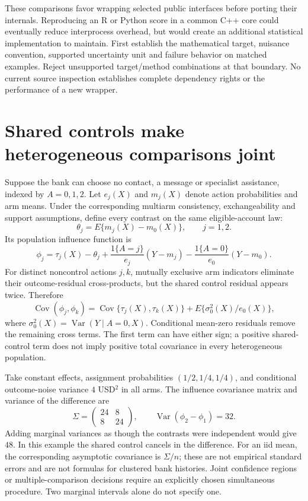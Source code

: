 These comparisons favor wrapping selected public interfaces before porting
their internals. Reproducing an R or Python score in a common C++ core could
eventually reduce interprocess overhead, but would create an additional
statistical implementation to maintain. First establish the mathematical
target, nuisance convention, supported uncertainty unit and failure behavior
on matched examples. Reject unsupported target/method combinations at that
boundary. No current source inspection establishes complete dependency rights
or the performance of a new wrapper.~\citep{exec17_s4_design}

\section{Shared controls make heterogeneous comparisons joint}
\label{exec17:s4-joint}

Suppose the bank can choose no contact, a message or specialist assistance,
indexed by $A=0,1,2$. Let $e_j(X)$ and $m_j(X)$ denote action probabilities
and arm means. Under the corresponding multiarm consistency, exchangeability
and support assumptions, define every contrast on the same eligible-account
law:
\[
 \theta_j=E\{m_j(X)-m_0(X)\},\qquad j=1,2.
\]
Its population influence function is
\[
 \phi_j=\tau_j(X)-\theta_j+
       \frac{1\{A=j\}}{e_j}(Y-m_j)
       -\frac{1\{A=0\}}{e_0}(Y-m_0).
\]
For distinct noncontrol actions $j,k$, mutually exclusive arm indicators
eliminate their outcome-residual cross-products, but the shared control
residual appears twice. Therefore
\begin{equation}
 \operatorname{Cov}(\phi_j,\phi_k)=
 \operatorname{Cov}\{\tau_j(X),\tau_k(X)\}
       +E\{\sigma_0^2(X)/e_0(X)\},
 \label{exec17:s4-shared-control}
\end{equation}
where $\sigma_0^2(X)=\operatorname{Var}(Y\mid A=0,X)$.
Conditional mean-zero residuals remove the remaining cross terms. The first
term can have either sign; a positive shared-control term does not imply
positive total covariance in every heterogeneous population.

Take constant effects, assignment probabilities $(1/2,1/4,1/4)$, and
conditional outcome-noise variance $4$ USD$^2$ in all arms. The influence
covariance matrix and variance of the difference are
\[
 \Sigma=\begin{pmatrix}24&8\\8&24\end{pmatrix},\qquad
 \operatorname{Var}(\phi_2-\phi_1)=32.
\]
Adding marginal variances as though the contrasts were independent would give
$48$. In this example the shared control cancels in the difference. For an
iid mean, the corresponding asymptotic covariance is $\Sigma/n$; these are
not empirical standard errors and are not formulas for clustered bank
histories. Joint confidence regions or multiple-comparison decisions require
an explicitly chosen simultaneous procedure. Two marginal intervals alone
do not specify one.~\citep{exec17_s4_math}

